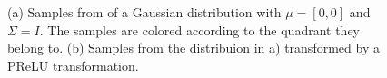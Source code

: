 \begin{figure}[!htb]
  \begin{subfigmatrix}{2}
  \end{subfigmatrix}
    \caption{(a) Samples from of a Gaussian distribution with $\mu = [0, 0]$ and $\Sigma = I$.
    The samples are colored according to the quadrant they belong to. (b) Samples from the
    distribuion in a) transformed by a PReLU transformation.}
  \label{fig:prelu}
\end{figure}

